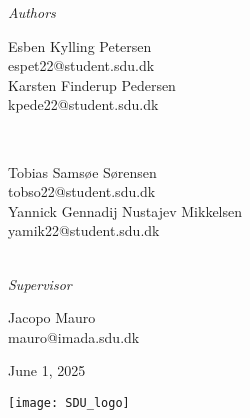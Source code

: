\begin{titlepage}
	\large
	\textit{Authors}\\ \bigskip
	\begin{minipage}[t]{0.45\textwidth}
	    \begin{center}
		    \normalsize
		    Esben Kylling Petersen \\
		    espet22@student.sdu.dk\\ \bigskip
		    Karsten Finderup Pedersen\\
		    kpede22@student.sdu.dk\\ \bigskip
	   \end{center}
	\end{minipage}
	~
	\begin{minipage}[t]{0.45\textwidth}
	    \begin{center}
		    \normalsize
		    Tobias Samsøe Sørensen\\
		    tobso22@student.sdu.dk\\ \bigskip
            Yannick Gennadij Nustajev Mikkelsen\\
		    yamik22@student.sdu.dk\\ \bigskip
		\end{center}
	\end{minipage}
    ~
    \vspace{1cm} \\
    \textit{Supervisor}\\
    \begin{center}
        \normalsize
        Jacopo Mauro\\
        mauro@imada.sdu.dk\\ \bigskip
    \end{center}
	
    

	\vfill\vfill\vfill %

	{\large June 1, 2025}


	\vfill\vfill
	\begin{centering}
	\texttt{[image: SDU\_logo]}\\[1cm]
	\end{centering}
	

	\vfill %

\end{titlepage}